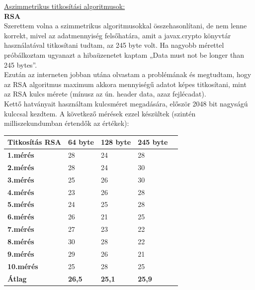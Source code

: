 \vspace{25pt} \noindent \underline{Aszimmetrikus titkosítási algoritmusok:}
\vspace{15pt} \\ \textbf{RSA}
\vspace{5pt} \\ Szerettem volna a szimmetrikus algoritmusokkal összehasonlítani, de nem lenne korrekt, mivel az adatmennyiség felsőhatára, amit a javax.crypto könyvtár használatával titkosítani tudtam, az 245 byte volt. Ha nagyobb mérettel próbálkoztam ugyanazt a hibaüzenetet kaptam „Data must not be longer than 245 bytes”.
\vspace{5pt} \\Ezután az interneten jobban utána olvastam a problémának és megtudtam, hogy az RSA algoritmus maximum akkora mennyiségű adatot képes titkosítani, mint az RSA kulcs mérete (mínusz az ún. header data, azaz fejlécadat). 
\vspace{5pt} \\Kettő hatványait használtam kulcsméret megadására, először 2048 bit nagyságú kulccsal kezdtem. A következő mérések ezzel készültek (szintén milliszekundumban értendők az értékek):

\begin{center}
	\begin{tabular}{|p{2.4cm}|p{2cm}|p{2cm}|p{2cm}|p{2cm}|}
		\hline
		\textbf{Titkosítás} \newline \textbf{RSA} & \textbf{64 byte} & \textbf{128 byte} & \textbf{245 byte}\\
		\hline
		\textbf{1.mérés} & 28 & 24 & 28\\
		\hline
		\textbf{2.mérés} & 28 & 24 & 30\\
		\hline
		\textbf{3.mérés} & 25 & 26 & 30\\
		\hline
		\textbf{4.mérés} & 23 & 26 & 28\\
		\hline
		\textbf{5.mérés} & 24 & 25 & 28\\
		\hline
		\textbf{6.mérés} & 26 & 21 & 25\\
		\hline
		\textbf{7.mérés} & 27 & 23 & 22\\
		\hline
		\textbf{8.mérés} & 30 & 28 & 22\\
		\hline
		\textbf{9.mérés} & 29 & 26 & 21\\
		\hline
		\textbf{10.mérés} & 25 & 28 & 25\\
		\hline
		\hline
		\textbf{Átlag} & \textbf{26,5} & \textbf{25,1} & \textbf{25,9}\\
		\hline
	\end{tabular}
\end{center}

